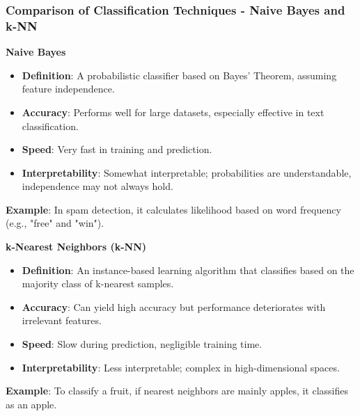\documentclass[aspectratio=169]{beamer}
\begin{document}
\begin{frame}[fragile]
    \frametitle{Comparison of Classification Techniques - Naive Bayes and k-NN}
    \textbf{Naive Bayes}
    \begin{itemize}
        \item \textbf{Definition}: A probabilistic classifier based on Bayes’ Theorem, assuming feature independence.
        \item \textbf{Accuracy}: Performs well for large datasets, especially effective in text classification.
        \item \textbf{Speed}: Very fast in training and prediction.
        \item \textbf{Interpretability}: Somewhat interpretable; probabilities are understandable, independence may not always hold.
    \end{itemize}
    
    \textbf{Example}: In spam detection, it calculates likelihood based on word frequency (e.g., "free" and "win").
    
    \vspace{1em}
    \textbf{k-Nearest Neighbors (k-NN)}
    \begin{itemize}
        \item \textbf{Definition}: An instance-based learning algorithm that classifies based on the majority class of k-nearest samples.
        \item \textbf{Accuracy}: Can yield high accuracy but performance deteriorates with irrelevant features.
        \item \textbf{Speed}: Slow during prediction, negligible training time.
        \item \textbf{Interpretability}: Less interpretable; complex in high-dimensional spaces.
    \end{itemize}
    
    \textbf{Example}: To classify a fruit, if nearest neighbors are mainly apples, it classifies as an apple.
\end{frame}
\end{document}
